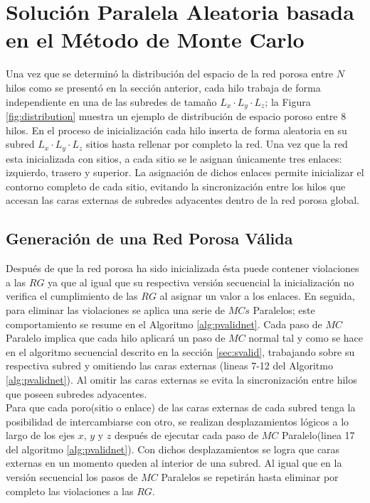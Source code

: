 \section{Solución Paralela Aleatoria basada en el Método de Monte Carlo}
\label{sec:pbiasedrg}
Una vez que se determinó la distribución del espacio de la red porosa entre $N$ hilos como se presentó 
en la sección anterior, cada hilo trabaja de forma independiente en una de las subredes de tamaño $L_x \cdot L_y \cdot L_z$; 
la Figura \ref{fig:distribution} muestra un ejemplo de distribución de espacio poroso entre $8$ hilos.
En el proceso de inicializaci\'on cada hilo inserta de forma aleatoria en su subred $L_x \cdot L_y \cdot L_z$ sitios 
hasta rellenar por completo la red. Una vez que la red esta inicializada con sitios, a cada sitio se le asignan únicamente tres 
enlaces: izquierdo, trasero y superior. La asignación de dichos enlaces permite inicializar el contorno completo de cada
sitio, evitando la sincronización entre los hilos que accesan las caras externas de subredes adyacentes dentro de la red porosa global.

\subsection{Generación de una Red Porosa Válida}
\label{subsec:pbiasedrgvalid}
Después de que la red porosa ha sido inicializada ésta puede contener violaciones a las $RG$ ya que al igual que su 
respectiva versi\'on secuencial la inicializaci\'on no verifica el cumplimiento de las $RG$ al asignar un valor a los enlaces.
En seguida, para eliminar las violaciones se aplica una serie de $MCs$ Paralelos; este comportamiento se 
resume en el Algoritmo \ref{alg:pvalidnet}. Cada paso de $MC$ Paralelo implica que cada hilo 
aplicará un paso de $MC$ normal tal y como se hace 
en el algoritmo secuencial descrito en la secci\'on \ref{sec:svalid}, trabajando sobre su respectiva subred y omitiendo las caras 
externas (lineas 7-12 del Algoritmo \ref{alg:pvalidnet}). Al omitir las caras externas se evita la sincronizaci\'on entre hilos
que poseen subredes adyacentes.\\

Para que cada poro(sitio o enlace) de las caras externas de cada subred tenga la posibilidad de intercambiarse con otro, se realizan 
desplazamientos lógicos a lo largo de los ejes $x$, $y$ y $z$ después de ejecutar cada paso de $MC$ 
Paralelo(linea 17 del algoritmo \ref{alg:pvalidnet}).
Con dichos desplazamientos se logra que caras externas en un momento queden al interior de una subred. Al igual que en la versi\'on 
secuencial los pasos de $MC$ Paralelos se repetirán hasta eliminar por completo las violaciones a las $RG$.\\

